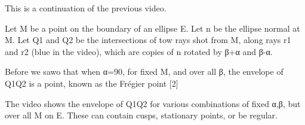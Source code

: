 This is a continuation of the previous video.

Let M be a point on the boundary of an ellipse E. Let n be the ellipse normal at M.  Let Q1 and Q2 be the intersections of tow rays shot from M, along rays r1 and r2 (blue in the video), which are copies of n rotated by β+α and β-α. 

Before we sawo that when α=90, for fixed M, and over all β, the envelope of Q1Q2 is a point, known as the Frégier point [2]

The video shows the envelope of Q1Q2 for various combinations of fixed α,β, but over all M on E. These can contain cusps, stationary points, or be regular.